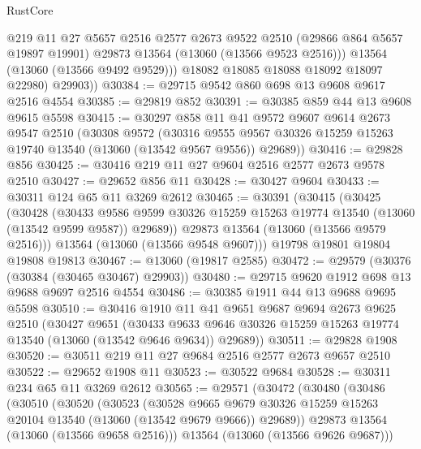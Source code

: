 \begin{lexlean}{RustCore}
\begin{coremodule}
              @219
              @11
              @27
              @5657
              @2516
              @2577
              @2673
              @9522
              @2510
              (@29866 @864 @5657 @19897 @19901)
              @29873
              @13564
              (@13060 (@13566 @9523 @2516)))
            @13564
            (@13060 (@13566 @9492 @9529)))
          @18082
          @18085
          @18088
          @18092
          @18097
          @22980)
        @29903))
@30384 := @29715 @9542 @860 @698 @13 @9608 @9617 @2516 @4554
@30385 := @29819 @852
@30391 := @30385 @859 @44 @13 @9608 @9615 @5598
@30415 := @30297
    @858
    @11
    @41
    @9572
    @9607
    @9614
    @2673
    @9547
    @2510
    (@30308
      @9572
      (@30316 @9555 @9567 @30326 @15259 @15263 @19740 @13540 (@13060 (@13542 @9567 @9556)) @29689))
@30416 := @29828 @856
@30425 := @30416 @219 @11 @27 @9604 @2516 @2577 @2673 @9578 @2510
@30427 := @29652 @856 @11
@30428 := @30427 @9604
@30433 := @30311 @124 @65 @11 @3269 @2612
@30465 := @30391
    (@30415
      (@30425
        (@30428
          (@30433
            @9586
            @9599
            @30326
            @15259
            @15263
            @19774
            @13540
            (@13060 (@13542 @9599 @9587))
            @29689))
        @29873
        @13564
        (@13060 (@13566 @9579 @2516)))
      @13564
      (@13060 (@13566 @9548 @9607)))
    @19798
    @19801
    @19804
    @19808
    @19813
@30467 := @13060 (@19817 @2585)
@30472 := @29579 (@30376 (@30384 (@30465 @30467) @29903))
@30480 := @29715 @9620 @1912 @698 @13 @9688 @9697 @2516 @4554
@30486 := @30385 @1911 @44 @13 @9688 @9695 @5598
@30510 := @30416
    @1910
    @11
    @41
    @9651
    @9687
    @9694
    @2673
    @9625
    @2510
    (@30427
      @9651
      (@30433 @9633 @9646 @30326 @15259 @15263 @19774 @13540 (@13060 (@13542 @9646 @9634)) @29689))
@30511 := @29828 @1908
@30520 := @30511 @219 @11 @27 @9684 @2516 @2577 @2673 @9657 @2510
@30522 := @29652 @1908 @11
@30523 := @30522 @9684
@30528 := @30311 @234 @65 @11 @3269 @2612
@30565 := @29571
    (@30472
      (@30480
        (@30486
          (@30510
            (@30520
              (@30523
                (@30528
                  @9665
                  @9679
                  @30326
                  @15259
                  @15263
                  @20104
                  @13540
                  (@13060 (@13542 @9679 @9666))
                  @29689))
              @29873
              @13564
              (@13060 (@13566 @9658 @2516)))
            @13564
            (@13060 (@13566 @9626 @9687)))

\end{coremodule}
\end{lexlean}
